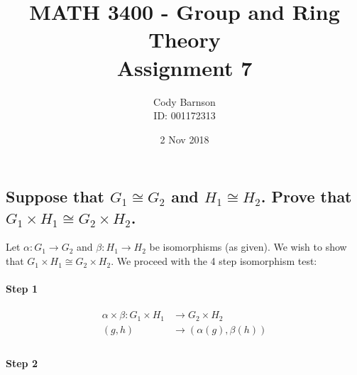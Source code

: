 \documentclass{article}
\begin{document}
    
  \title{MATH 3400 - Group and Ring Theory\\Assignment 7}
  \author{Cody Barnson\\ ID: 001172313}
  \date{2 Nov 2018}
  \maketitle
  \newpage
  
  
  
  \section*{}
  
  \subsection{Suppose that $G_1 \cong G_2$ and $H_1 \cong H_2$. Prove that $G_1 \times H_1 \cong G_2 \times H_2$.}

  Let $\alpha : G_1 \longrightarrow G_2$ and $\beta : H_1 \longrightarrow H_2$ be isomorphisms (as given).  We wish to show that $G_1 \times H_1 \cong G_2 \times H_2$.  We proceed with the 4 step isomorphism test:

  \paragraph{Step 1}
  
  \begin{align*}
    \alpha \times \beta : G_1 \times H_1 &\longrightarrow G_2 \times H_2 \\
    (g, h) &\longrightarrow (\alpha(g), \beta(h)) \\
  \end{align*}

  \newcommand{\ab}{\alpha \times \beta }
  \newcommand{\al}{\alpha}
  \newcommand{\bb}{\beta}

  \paragraph{Step 2}
\end{document}
